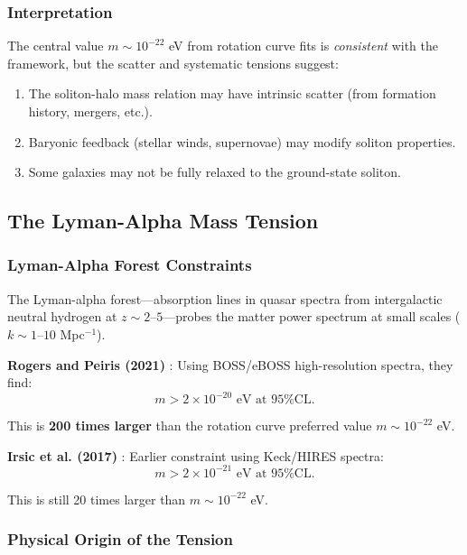 \documentclass[11pt,a4paper]{article}
\theoremstyle{definition}
\theoremstyle{remark}
\begin{document}
\subsubsection{Interpretation}

The central value $m \sim 10^{-22}$ eV from rotation curve fits is \emph{consistent} with the framework, but the scatter and systematic tensions suggest:
\begin{enumerate}[leftmargin=*]
\item The soliton-halo mass relation may have intrinsic scatter (from formation history, mergers, etc.).
\item Baryonic feedback (stellar winds, supernovae) may modify soliton properties.
\item Some galaxies may not be fully relaxed to the ground-state soliton.
\end{enumerate}

\subsection{The Lyman-Alpha Mass Tension}
\label{sec:lyman_alpha}

\subsubsection{Lyman-Alpha Forest Constraints}

The Lyman-alpha forest---absorption lines in quasar spectra from intergalactic neutral hydrogen at $z \sim 2$--$5$---probes the matter power spectrum at small scales ($k \sim 1$--$10$ Mpc$^{-1}$).

\textbf{Rogers and Peiris (2021)} \cite{RogersPeiris2021}: Using BOSS/eBOSS high-resolution spectra, they find:
\begin{equation}
\boxed{m > 2 \times 10^{-20} \text{ eV at 95\% CL}.}
\end{equation}

This is \textbf{200 times larger} than the rotation curve preferred value $m \sim 10^{-22}$ eV.

\textbf{Irsic et al. (2017)} \cite{Irsic2017}: Earlier constraint using Keck/HIRES spectra:
\begin{equation}
m > 2 \times 10^{-21} \text{ eV at 95\% CL}.
\end{equation}

This is still 20 times larger than $m \sim 10^{-22}$ eV.

\subsubsection{Physical Origin of the Tension}
\end{document}
